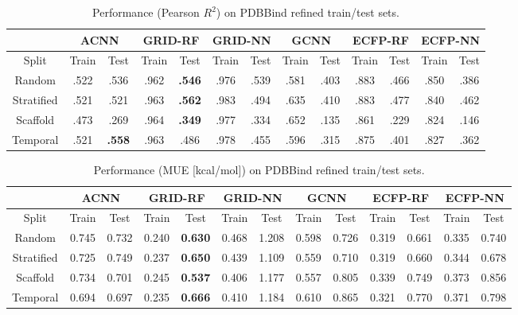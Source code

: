 \begin{table}[h]
  \centering
    \begin{tabular}{|c||c|c||c|c||c|c||c|c||c|c||c|c|}
    \hline
    \multicolumn{1}{|c||}{} & \multicolumn{2}{c||}{ACNN} & \multicolumn{2}{c||}{GRID-RF} & \multicolumn{2}{c||}{GRID-NN} & \multicolumn{2}{c||}{GCNN} & \multicolumn{2}{c||}{ECFP-RF} & \multicolumn{2}{c|}{ECFP-NN}\\
    \hline
    \hline
    Split & Train & Test & Train & Test & Train & Test & Train & Test & Train & Test & Train & Test \\
    \hline
    Random & .522 & .536 & .962 & \textbf{.546} & .976 & .539 & .581 & .403 & .883 & .466 & .850 & .386 \\
    Stratified & .521 & .521 & .963 & \textbf{.562} & .983 & .494 & .635 & .410 & .883 & .477 & .840 & .462 \\
    Scaffold & .473 & .269 & .964 & \textbf{.349} & .977 & .334 & .652 & .135 & .861 & .229 & .824 & .146 \\
    Temporal & .521 & \textbf{.558} & .963 & .486 & .978 & .455 & .596 & .315 & .875 & .401 & .827 & .362 \\
    \hline
    \end{tabular}
  \caption{Performance (Pearson $R^2$) on PDBBind refined train/test sets.}
  \label{tab:refined-pearson}
\end{table}
\begin{table}[h]
  \centering
    \begin{tabular}{|c||c|c||c|c||c|c||c|c||c|c||c|c|}
    \hline
    \multicolumn{1}{|c||}{} & \multicolumn{2}{c||}{ACNN} & \multicolumn{2}{c||}{GRID-RF} & \multicolumn{2}{c||}{GRID-NN} & \multicolumn{2}{c||}{GCNN} & \multicolumn{2}{c||}{ECFP-RF} & \multicolumn{2}{c|}{ECFP-NN}\\
    \hline
    \hline
    Split & Train & Test & Train & Test & Train & Test & Train & Test & Train & Test & Train & Test \\
    \hline
    Random & 0.745 & 0.732 & 0.240 & \textbf{0.630} & 0.468 & 1.208 & 0.598 & 0.726 & 0.319 & 0.661 & 0.335 & 0.740 \\
    Stratified & 0.725 &  0.749 & 0.237 & \textbf{0.650} & 0.439 & 1.109 & 0.559 & 0.710 & 0.319 & 0.660 & 0.344 & 0.678 \\
    Scaffold & 0.734 & 0.701 & 0.245 & \textbf{0.537} & 0.406 & 1.177 & 0.557 & 0.805 & 0.339 & 0.749 & 0.373 & 0.856 \\
    Temporal & 0.694 & 0.697 & 0.235 & \textbf{0.666} & 0.410 & 1.184 & 0.610 & 0.865 & 0.321 & 0.770 & 0.371 & 0.798 \\
    \hline
    \end{tabular}	
  \caption{Performance (MUE [kcal/mol]) on PDBBind refined train/test sets.}
  \label{tab:refined-mae}
\end{table}

